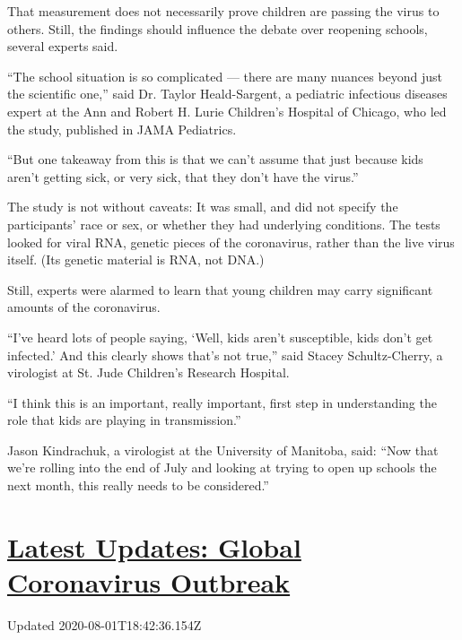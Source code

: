 That measurement does not necessarily prove children are passing the
virus to others. Still, the findings should influence the debate over
reopening schools, several experts said.

``The school situation is so complicated --- there are many nuances
beyond just the scientific one,'' said Dr. Taylor Heald-Sargent, a
pediatric infectious diseases expert at the Ann and Robert H. Lurie
Children's Hospital of Chicago, who led the study, published in JAMA
Pediatrics.

``But one takeaway from this is that we can't assume that just because
kids aren't getting sick, or very sick, that they don't have the
virus.''

The study is not without caveats: It was small, and did not specify the
participants' race or sex, or whether they had underlying conditions.
The tests looked for viral RNA, genetic pieces of the coronavirus,
rather than the live virus itself. (Its genetic material is RNA, not
DNA.)

Still, experts were alarmed to learn that young children may carry
significant amounts of the coronavirus.

``I've heard lots of people saying, `Well, kids aren't susceptible, kids
don't get infected.' And this clearly shows that's not true,'' said
Stacey Schultz-Cherry, a virologist at St. Jude Children's Research
Hospital.

``I think this is an important, really important, first step in
understanding the role that kids are playing in transmission.''

Jason Kindrachuk, a virologist at the University of Manitoba, said:
``Now that we're rolling into the end of July and looking at trying to
open up schools the next month, this really needs to be considered.''

\hypertarget{latest-updates-global-coronavirus-outbreak}{%
\section{\texorpdfstring{\href{https://www.nytimes.com/2020/08/01/world/coronavirus-covid-19.html?action=click\&pgtype=Article\&state=default\&region=MAIN_CONTENT_1\&context=storylines_live_updates}{Latest
Updates: Global Coronavirus
Outbreak}}{Latest Updates: Global Coronavirus Outbreak}}\label{latest-updates-global-coronavirus-outbreak}}

Updated 2020-08-01T18:42:36.154Z

